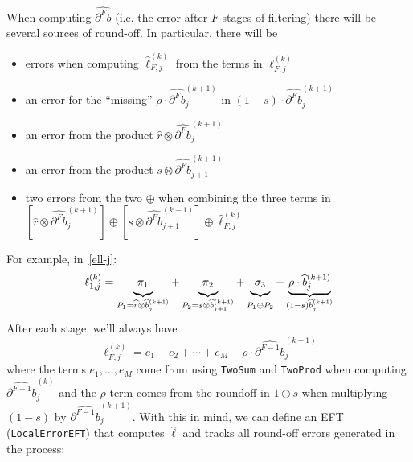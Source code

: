 \documentclass[letterpaper,10pt]{article}
\theoremstyle{definition}
\begin{document}
When computing \(\widehat{\partial^F b}\) (i.e. the error after
\(F\) stages of filtering)
there will be several sources of round-off. In particular, there will be
\begin{itemize}
\item errors when computing \(\widehat{\ell}_{F, j}^{(k)}\) from the
  terms in \(\ell_{F, j}^{(k)}\)
\item an error
for the ``missing'' \(\rho \cdot \widehat{\partial^F b}_j^{(k + 1)}\) in
\((1 - s) \cdot \widehat{\partial^F b}_j^{(k + 1)}\)
\item an error from the product
  \(\widehat{r} \otimes \widehat{\partial^F b}_j^{(k + 1)}\)
\item an error from the product
  \(s \otimes \widehat{\partial^F b}_{j + 1}^{(k + 1)}\)
\item two errors from the two \(\oplus\) when combining the three
  terms in
  \(\left[\widehat{r} \otimes \widehat{\partial^F b}_j^{(k + 1)}\right] \oplus
  \left[s \otimes \widehat{\partial^F b}_{j + 1}^{(k + 1)}\right] \oplus
  \widehat{\ell}_{F, j}^{(k)}\)
\end{itemize}
For example, in~\eqref{ell-j}:
\begin{equation}
\ell_{1, j}^{(k)} =
    \underbrace{\vphantom{\rho \cdot \widehat{b}_j^{(k + 1)}} \pi_1}_{
        \vphantom{(1 - s) \widehat{b}_j^{(k + 1)}}
        P_1 = \widehat{r} \otimes \widehat{b}_j^{(k + 1)}} +
    \underbrace{\vphantom{\rho \cdot \widehat{b}_j^{(k + 1)}} \pi_2}_{
        \vphantom{(1 - s) \widehat{b}_j^{(k + 1)}}
        P_2 = s \otimes \widehat{b}_{j + 1}^{(k + 1)}} +
    \underbrace{\vphantom{\rho \cdot \widehat{b}_j^{(k + 1)}} \sigma_3}_{
        \vphantom{(1 - s) \widehat{b}_j^{(k + 1)}}
        P_1 \oplus P_2} +
    \underbrace{\rho \cdot \widehat{b}_j^{(k + 1)}}_{
        (1 - s) \widehat{b}_j^{(k + 1)}}
\end{equation}
After each stage, we'll always have
\begin{equation}
\ell_{F, j}^{(k)} = e_1 + e_2 + \cdots + e_M + \rho \cdot
\widehat{\partial^{F - 1} b}_j^{(k + 1)}
\end{equation}
where the terms \(e_1, \ldots, e_M\) come from using \texttt{TwoSum} and
\texttt{TwoProd} when computing \(\widehat{\partial^{F - 1} b}_j^{(k)}\)
and the \(\rho\) term comes from the roundoff
in \(1 \ominus s\) when multiplying \((1 - s)\) by
\(\widehat{\partial^{F - 1} b}_j^{(k + 1)}\). With this in mind, we
can define an EFT (\texttt{LocalErrorEFT}) that computes
\(\widehat{\ell}\) and tracks all round-off errors generated in
the process:
\end{document}
